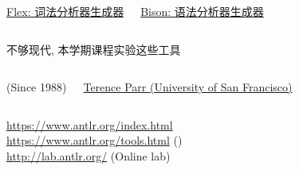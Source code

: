 \begin{frame}{}
  \begin{columns}
    \begin{center}
      \href{https://en.wikipedia.org/wiki/Flex_(lexical_analyser_generator)}{\footnotesize Flex: 词法分析器生成器}
    \end{center}
    \begin{center}
      \href{https://en.wikipedia.org/wiki/GNU_Bison}{\footnotesize Bison: 语法分析器生成器}
    \end{center}
  \end{columns}

  \vspace{0.50cm}
  \begin{center}
    不够现代, 本学期课程实验这些工具
  \end{center}
\end{frame}

\begin{frame}{}
  \begin{columns}
    \begin{center}
      (Since 1988)
    \end{center}
    \begin{center}
      \href{https://parrt.cs.usfca.edu/}{\small Terence Parr (University of San Francisco)}
    \end{center}
  \end{columns}

  \vspace{0.80cm}
  \begin{center}
    \url{https://www.antlr.org/index.html} \\[5pt]
    \url{https://www.antlr.org/tools.html} () \\[5pt]
    \url{http://lab.antlr.org/} (Online lab)
  \end{center}
\end{frame}


